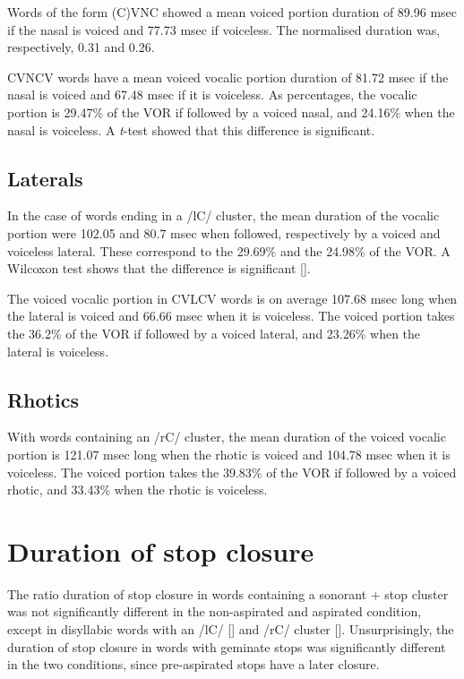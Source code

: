 \documentclass[11pt,a4paper,openany]{memoir}\usepackage[]{graphicx}\usepackage[]{color}
\begin{document}
Words of the form (C)VNC showed a mean voiced portion duration of 89.96 msec if the nasal is voiced and 77.73 msec if voiceless.
The normalised duration was, respectively, 0.31 and 0.26.




CVNCV words have a mean voiced vocalic portion duration of 81.72 msec if the nasal is voiced and 67.48 msec if it is voiceless.
As percentages, the vocalic portion is 29.47\% of the VOR if followed by a voiced nasal, and 24.16\% when the nasal is voiceless.
A \textit{t}-test showed that this difference is significant.


\subsection{Laterals}


In the case of words ending in a /lC/ cluster, the mean duration of the vocalic portion were 102.05 and 80.7 msec when followed, respectively by a voiced and voiceless lateral.
These correspond to the 29.69\% and the 24.98\% of the VOR.
A Wilcoxon test shows that the difference is significant [].




The voiced vocalic portion in CVLCV words is on average 107.68 msec long when the lateral is voiced and 66.66 msec when it is voiceless.
The voiced portion takes the 36.2\% of the VOR if followed by a voiced lateral, and 23.26\% when the lateral is voiceless.

\subsection{Rhotics}



With words containing an /rC/ cluster, the mean duration of the voiced vocalic portion is 121.07 msec long when the rhotic is voiced and 104.78 msec when it is voiceless.
The voiced portion takes the 39.83\% of the VOR if followed by a voiced rhotic, and 33.43\% when the rhotic is voiceless.


\section{Duration of stop closure}


The ratio duration of stop closure in words containing a sonorant + stop cluster was not significantly different in the non-aspirated and aspirated condition, except in disyllabic words with an /lC/ [] and /rC/ cluster [].
Unsurprisingly, the duration of stop closure in words with geminate stops was significantly different in the two conditions, since pre-aspirated stops have a later closure.
\end{document}
